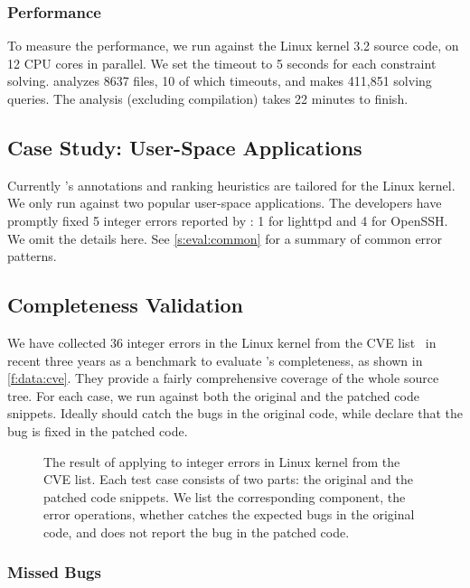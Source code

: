 \subsubsection{Performance}

To measure the performance, we run \sys against the Linux kernel
3.2 source code, on 12 CPU cores in parallel.  We set the timeout
to 5 seconds for each constraint solving.   \sys analyzes 8637 files,
10 of which timeouts, and makes 411,851 solving queries.  The
analysis (excluding compilation) takes 22 minutes to finish.

\subsection{Case Study: User-Space Applications}

Currently \sys's annotations and ranking heuristics are tailored
for the Linux kernel.  We only run \sys against two popular user-space
applications.  The developers have promptly fixed 5 integer errors
reported by \sys: 1 for lighttpd and 4 for OpenSSH.  We omit the
details here.  See \autoref{s:eval:common} for a summary of common
error patterns.

\subsection{Completeness Validation}

We have collected 36 integer errors in the Linux kernel from the
CVE list~\cite{cve} in recent three years as a benchmark to evaluate
\sys's completeness, as shown in \autoref{f:data:cve}.  They provide
a fairly comprehensive coverage of the whole source tree.  For each
case, we run \sys against both the original and the patched code
snippets.  Ideally \sys should catch the bugs in the original code,
while declare that the bug is fixed in the patched code.

\begin{figure*}
\centering
\footnotesize

\caption{The result of applying \sys to integer errors in Linux
kernel from the CVE list.  Each test case consists of two parts:
the original and the patched code snippets.  We list the corresponding
component, the error operations, whether \sys catches the expected
bugs in the original code, and does not report the bug in the patched
code.}
\label{f:data:cve}
\end{figure*}

\subsubsection{Missed Bugs}

